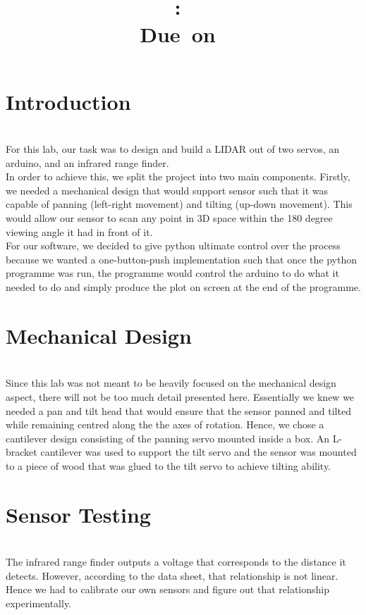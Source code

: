 \documentclass{article}
\title{
\vspace{2in}
\textmd{\textbf{\hmwkClass:\ \hmwkTitle}}\\
\normalsize\vspace{0.1in}\small{Due\ on\ \hmwkDueDate}\\
\vspace{3in}
}
\author{\textbf{\hmwkAuthorName}}
\date{} %
\begin{document}
\maketitle
\newpage
\section{Introduction} \ \\
For this lab, our task was to design and build a LIDAR out of two servos, an arduino, and an infrared range finder. \\

In order to achieve this, we split the project into two main components. Firstly, we needed a mechanical design that would support sensor such that it was capable of panning (left-right movement) and tilting (up-down movement). This would allow our sensor to scan any point in 3D space within the 180 degree viewing angle it had in front of it. \\

For our software, we decided to give python ultimate control over the process because we wanted a one-button-push implementation such that once the python programme was run, the programme would control the arduino to do what it needed to do and simply produce the plot on screen at the end of the programme.

\section{Mechanical Design}\ \\
Since this lab was not meant to be heavily focused on the mechanical design aspect, there will not be too much detail presented here. Essentially we knew we needed a pan and tilt head that would ensure that the sensor panned and tilted while remaining centred along the the axes of rotation. Hence, we chose a cantilever design consisting of the panning servo mounted inside a box. An L-bracket cantilever was used to support the tilt servo and the sensor was mounted to a piece of wood that was glued to the tilt servo to achieve tilting ability. \\

\section{Sensor Testing} \ \\
The infrared range finder outputs a voltage that corresponds to the distance it detects. However, according to the data sheet, that relationship is not linear. Hence we had to calibrate our own sensors and figure out that relationship experimentally. \\
\end{document}
